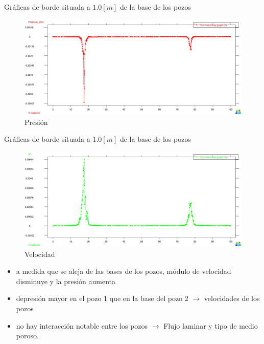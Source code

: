 \documentclass[spanish]{beamer}
\begin{document}
%
%
\begin{frame}{Gráficas de borde situada a $1.0[m]$ de la base de los pozos}
\begin{center}
\begin{figure}[htbp]
\centerline{\includegraphics[scale=0.25]{../img/100m/grf/100_grafico_presion_x_centro_pozos_distancia1}}
\caption{Presión}
\end{figure}
\end{center}
\end{frame}
%
%
\begin{frame}{Gráficas de borde situada a $1.0[m]$ de la base de los pozos}
\begin{center}
\begin{figure}[htbp]
\centerline{\includegraphics[scale=0.25]{../img/100m/grf/100_grafico_velocidad_x_centro_pozos_distancia1}}
\caption{Velocidad}
\end{figure}
\end{center}
\end{frame}
%
\begin{frame}
\begin{itemize}
\item a medida que se aleja de las bases de los pozos, módulo de velocidad disminuye y  la presión aumenta
\item depresión mayor en el pozo 1 que en la base del pozo 2 $\rightarrow$ velocidades de los pozos
\item no hay interacción notable entre los pozos $\rightarrow$ Flujo laminar y tipo de medio poroso.
\end{itemize}
\end{frame}
%
\end{document}
